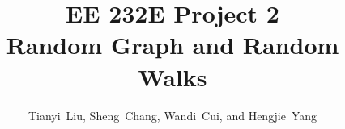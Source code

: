 \documentclass[draftcls,12pt,onecolumn]{IEEEtran}
\begin{document}
\title{EE 232E Project 2 \\ Random Graph and Random Walks}


\author{Tianyi~Liu, 
        Sheng~Chang,
        Wandi~Cui,
        and Hengjie~Yang
}

\maketitle
\IEEEpeerreviewmaketitle





\end{document}
